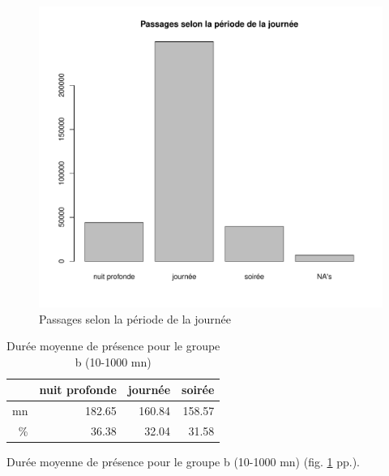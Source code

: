 \documentclass[12pt,english,french,twoside]{book}\usepackage[]{graphicx}\usepackage[]{color}
\makeatletter
\def\maxwidth{ %
  \ifdim\Gin@nat@width>\linewidth
    \linewidth
  \else
    \Gin@nat@width
  \fi
}
\newenvironment{knitrout}{}{} %
\makeatother
\begin{document}
\begin{figure}[ht!]
 \centering
\begin{knitrout}
\color{fgcolor}
\includegraphics[width=\maxwidth]{figure/periode_1} 

\end{knitrout}

 \caption{Passages selon la période de la journée}
 \label{fig:bp_periode1}
\end{figure}

\begin{table}[ht]
\centering
\begin{tabular}{rrrr}
  \hline
 & nuit profonde & journée & soirée \\ 
  \hline
mn & 182.65 & 160.84 & 158.57 \\ 
  \% & 36.38 & 32.04 & 31.58 \\ 
   \hline
\end{tabular}
\caption{Durée moyenne de présence pour le groupe b (10-1000 mn)} 
\label{b_periode}
\end{table}



Durée moyenne de présence pour le groupe b (10-1000 mn) (fig. \ref{b_periode} pp.\pageref{b_periode}).
\end{document}
